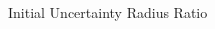 \documentclass[conference]{IEEEtran}
\begin{document}
\begin{figure}[H]
	\begin{subfigmatrix}{2}%
		\centering
		\hspace*{0mm}
	\end{subfigmatrix}
	\caption{Initial Uncertainty Radius Ratio}
	\label{fig:RinitSelection}
\end{figure}
\end{document}
